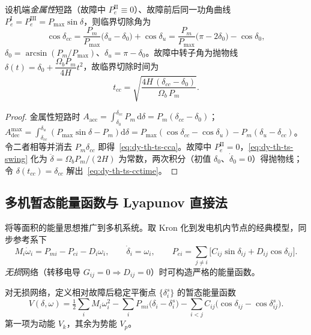 \begin{corollary}[临界切除角与临界切除时间]\label{cor:dy-th-ts-cct}
设机端\emph{金属性}短路（故障中 $P_e^{\mathrm{II}}\equiv0$）、故障前后同一功角曲线
$P_e^{\mathrm{I}}=P_e^{\mathrm{III}}=P_{\max}\sin\delta$，则临界切除角为
\begin{equation}
 \cos\delta_{cc}=\frac{P_m}{P_{\max}}\bigl(\delta_u-\delta_0\bigr)+\cos\delta_u
 =\frac{P_m}{P_{\max}}\bigl(\pi-2\delta_0\bigr)-\cos\delta_0,
 \label{eq:dy-th-ts-cca}
\end{equation}
$\delta_0=\arcsin(P_m/P_{\max})$、$\delta_u=\pi-\delta_0$。故障中转子角为抛物线
$\delta(t)=\delta_0+\dfrac{\Omega_bP_m}{4H}t^2$，故临界切除时间为
\begin{equation}
 t_{cc}=\sqrt{\frac{4H\,(\delta_{cc}-\delta_0)}{\Omega_b\,P_m}}.
 \label{eq:dy-th-ts-cctime}
\end{equation}
\end{corollary}

\begin{proof}
金属性短路时 $A_{\mathrm{acc}}=\int_{\delta_0}^{\delta_{cc}}P_m\,\mathrm d\delta=P_m(\delta_{cc}-\delta_0)$；
$A_{\mathrm{dec}}^{\max}=\int_{\delta_{cc}}^{\delta_u}(P_{\max}\sin\delta-P_m)\mathrm d\delta
=P_{\max}(\cos\delta_{cc}-\cos\delta_u)-P_m(\delta_u-\delta_{cc})$。令二者相等并消去 $P_m\delta_{cc}$
即得~\eqref{eq:dy-th-ts-cca}。故障中 $P_e^{\mathrm{II}}=0$，\eqref{eq:dy-th-ts-swing} 化为
$\ddot\delta=\Omega_bP_m/(2H)$ 为常数，两次积分（初值 $\delta_0$、$\dot\delta_0=0$）得抛物线；
令 $\delta(t_{cc})=\delta_{cc}$ 解出~\eqref{eq:dy-th-ts-cctime}。
\end{proof}

\subsection{多机暂态能量函数与 Lyapunov 直接法}\label{sec:dy-th-ts-tef}
将等面积的能量思想推广到多机系统。取 Kron 化到发电机内节点的经典模型，同步参考系下
\begin{equation}
 M_i\dot\omega_i=P_{mi}-P_{ei}-D_i\omega_i,\qquad \dot\delta_i=\omega_i,\qquad
 P_{ei}=\sum_{j\ne i}\bigl[C_{ij}\sin\delta_{ij}+D_{ij}\cos\delta_{ij}\bigr].
 \label{eq:dy-th-ts-mm}
\end{equation}
\emph{无损}网络（转移电导 $G_{ij}=0\Rightarrow D_{ij}=0$）时可构造严格的能量函数。

\begin{definition}[暂态能量函数]\label{def:dy-th-ts-tef}
对无损网络，定义相对故障后稳定平衡点 $\{\delta_i^{s}\}$ 的暂态能量函数
\begin{equation}
 V(\delta,\omega)=\tfrac12\sum_i M_i\omega_i^2
 -\sum_i P_{mi}\bigl(\delta_i-\delta_i^{s}\bigr)
 -\sum_{i<j}C_{ij}\bigl(\cos\delta_{ij}-\cos\delta_{ij}^{s}\bigr).
 \label{eq:dy-th-ts-Vdef}
\end{equation}
第一项为动能 $V_k$，其余为势能 $V_p$。
\end{definition}

